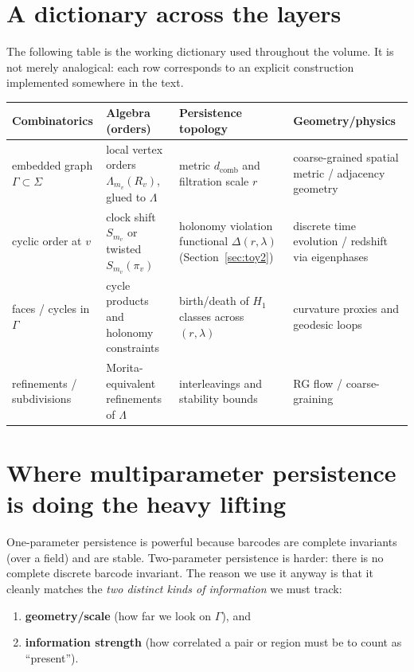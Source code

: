 \documentclass[11pt,oneside]{amsbook}
\numberwithin{equation}{section}
\theoremstyle{plain}
\theoremstyle{definition}
\theoremstyle{remark}
\begin{document}
\section*{A dictionary across the layers}

The following table is the working dictionary used throughout the volume.
It is not merely analogical: each row corresponds to an explicit construction implemented somewhere in the text.

\begin{longtable}{p{}p{}p{}p{}}
\toprule
\textbf{Combinatorics} & \textbf{Algebra (orders)} & \textbf{Persistence topology} & \textbf{Geometry/physics}\\
\midrule
embedded graph $\Gamma\subset\Sigma$ &
local vertex orders $\Lambda_{m_v}(R_v)$, glued to $\Lambda$ &
metric $d_{\mathrm{comb}}$ and filtration scale $r$ &
coarse-grained spatial metric / adjacency geometry\\
\addlinespace
cyclic order at $v$ &
clock shift $S_{m_v}$ or twisted $S_{m_v}(\pi_v)$ &
holonomy violation functional $\Delta(r,\lambda)$ (Section~\ref{sec:toy2}) &
discrete time evolution / redshift via eigenphases\\
\addlinespace
faces / cycles in $\Gamma$ &
cycle products and holonomy constraints &
birth/death of $H_1$ classes across $(r,\lambda)$ &
curvature proxies and geodesic loops\\
\addlinespace
refinements / subdivisions &
Morita-equivalent refinements of $\Lambda$ &
interleavings and stability bounds &
RG flow / coarse-graining\\
\bottomrule
\end{longtable}

\section*{Where multiparameter persistence is doing the heavy lifting}

One-parameter persistence is powerful because barcodes are complete invariants (over a field) and are stable.
Two-parameter persistence is harder: there is no complete discrete barcode invariant.
The reason we use it anyway is that it cleanly matches the \emph{two distinct kinds of information} we must track:
\begin{enumerate}
\item \textbf{geometry/scale} (how far we look on $\Gamma$), and
\item \textbf{information strength} (how correlated a pair or region must be to count as ``present'').
\end{enumerate}
\end{document}
